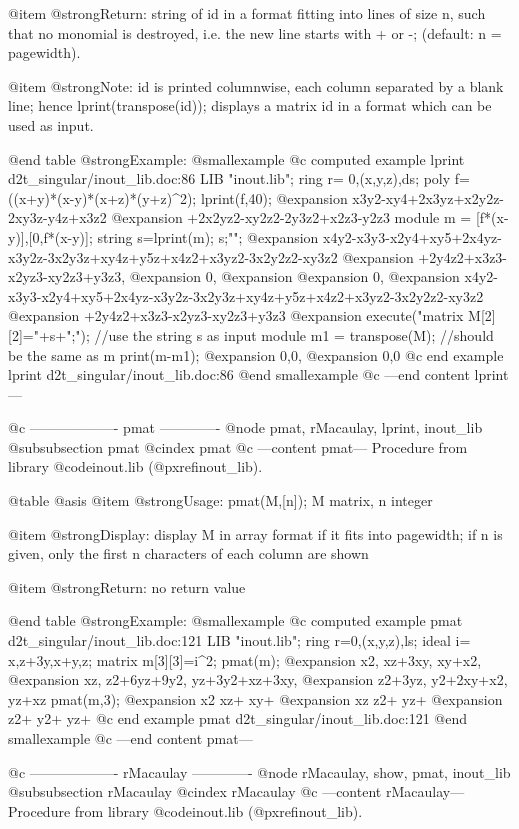 @item @strong{Return:}
string of id in a format fitting into lines of size n, such that no
monomial is destroyed, i.e. the new line starts with + or -;
(default: n = pagewidth).

@item @strong{Note:}
id is printed columnwise, each column separated by a blank line;
hence lprint(transpose(id)); displays a matrix id in a format which
can be used as input.

@end table
@strong{Example:}
@smallexample
@c computed example lprint d2t_singular/inout_lib.doc:86 
LIB "inout.lib";
ring r= 0,(x,y,z),ds;
poly f=((x+y)*(x-y)*(x+z)*(y+z)^2);
lprint(f,40);
@expansion{}   x3y2-xy4+2x3yz+x2y2z-2xy3z-y4z+x3z2
@expansion{} +2x2yz2-xy2z2-2y3z2+x2z3-y2z3
module m = [f*(x-y)],[0,f*(x-y)];
string s=lprint(m); s;"";
@expansion{}   x4y2-x3y3-x2y4+xy5+2x4yz-x3y2z-3x2y3z+xy4z+y5z+x4z2+x3yz2-3x2y2z2-xy3z2
@expansion{} +2y4z2+x3z3-x2yz3-xy2z3+y3z3,
@expansion{}   0,
@expansion{} 
@expansion{}   0,
@expansion{}   x4y2-x3y3-x2y4+xy5+2x4yz-x3y2z-3x2y3z+xy4z+y5z+x4z2+x3yz2-3x2y2z2-xy3z2
@expansion{} +2y4z2+x3z3-x2yz3-xy2z3+y3z3
@expansion{} 
execute("matrix M[2][2]="+s+";");      //use the string s as input
module m1 = transpose(M);	          //should be the same as m
print(m-m1);
@expansion{} 0,0,
@expansion{} 0,0 
@c end example lprint d2t_singular/inout_lib.doc:86
@end smallexample
@c ---end content lprint---

@c ------------------- pmat -------------
@node pmat, rMacaulay, lprint, inout_lib
@subsubsection pmat
@cindex pmat
@c ---content pmat---
Procedure from library @code{inout.lib} (@pxref{inout_lib}).

@table @asis
@item @strong{Usage:}
pmat(M,[n]); M matrix, n integer

@item @strong{Display:}
display M in array format if it fits into pagewidth; if n is given,
only the first n characters of each column are shown

@item @strong{Return:}
no return value

@end table
@strong{Example:}
@smallexample
@c computed example pmat d2t_singular/inout_lib.doc:121 
LIB "inout.lib";
ring r=0,(x,y,z),ls;
ideal i= x,z+3y,x+y,z;
matrix m[3][3]=i^2;
pmat(m);
@expansion{} x2,     xz+3xy,     xy+x2,         
@expansion{} xz,     z2+6yz+9y2, yz+3y2+xz+3xy, 
@expansion{} z2+3yz, y2+2xy+x2,  yz+xz
pmat(m,3);
@expansion{} x2  xz+ xy+ 
@expansion{} xz  z2+ yz+ 
@expansion{} z2+ y2+ yz+ 
@c end example pmat d2t_singular/inout_lib.doc:121
@end smallexample
@c ---end content pmat---

@c ------------------- rMacaulay -------------
@node rMacaulay, show, pmat, inout_lib
@subsubsection rMacaulay
@cindex rMacaulay
@c ---content rMacaulay---
Procedure from library @code{inout.lib} (@pxref{inout_lib}).

